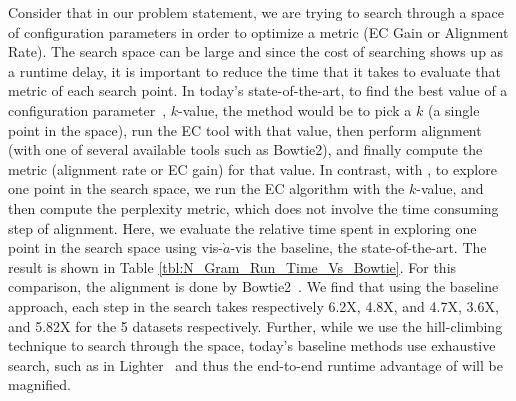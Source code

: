 Consider that in our problem statement, we are trying to search through a space of configuration parameters in order to optimize a metric (EC Gain or Alignment Rate). The search space can be large and since the cost of searching shows up as a runtime delay, it is important to reduce the time that it takes to evaluate that metric of each search point. In today's state-of-the-art, to find the best value of a configuration parameter~\cite{chikhi2013informed, mahadik2017scalable}, \eg $k$-value, the method would be to pick a $k$ (a single point in the space), run the EC tool with that value, then perform alignment (with one of several available tools such as Bowtie2), and finally compute the metric (alignment rate or EC gain) for that value. In contrast, with \name, to explore one point in the search space, we run the EC algorithm with the $k$-value, and then compute the perplexity metric, which does not involve the time consuming step of alignment. Here, we evaluate the relative time spent in exploring one point in the search space using \name vis-$\grave{a}$-vis the baseline, the state-of-the-art. The result is shown in Table \ref{tbl:N_Gram_Run_Time_Vs_Bowtie}. For this comparison, the alignment is done by Bowtie2~\cite{langmead2012fast}. We find that using the baseline approach, each step in the search takes respectively 6.2X, 4.8X, and 4.7X, 3.6X, and 5.82X for the 5 datasets respectively. Further, while we use the hill-climbing technique to search through the space, today's baseline methods use exhaustive search, such as in Lighter~\cite{song2014lighter} and thus the end-to-end runtime advantage of \name will be magnified. 


